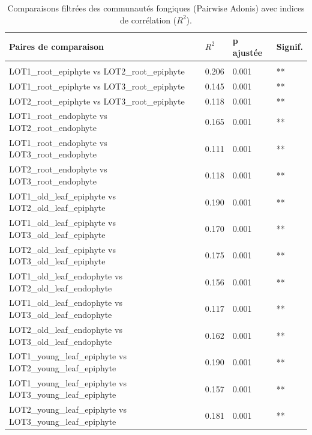 \documentclass[a4paper,12pt]{article}
\begin{document}
\begin{table}[H]
    \centering
    \caption{Comparaisons filtrées des communautés fongiques (Pairwise Adonis) avec indices de corrélation ($R^2$).}
    \label{tab:permanova_pairwise_final}
    \renewcommand{\arraystretch}{1.1}
    \setlength{\tabcolsep}{6pt}
    \small
    \begin{tabular}{llll}
        \hline
        \textbf{Paires de comparaison} & \textbf{$R^2$} & \textbf{p ajustée} & \textbf{Signif.} \\
        \hline
        \rowcolor[gray]{0.9} \multicolumn{4}{l}{\textit{Comparaisons Inter-sites (Même organe \& Même position)}} \\
        LOT1\_root\_epiphyte vs LOT2\_root\_epiphyte & 0.206 & 0.001 & ** \\
        LOT1\_root\_epiphyte vs LOT3\_root\_epiphyte & 0.145 & 0.001 & ** \\
        LOT2\_root\_epiphyte vs LOT3\_root\_epiphyte & 0.118 & 0.001 & ** \\
        LOT1\_root\_endophyte vs LOT2\_root\_endophyte & 0.165 & 0.001 & ** \\
        LOT1\_root\_endophyte vs LOT3\_root\_endophyte & 0.111 & 0.001 & ** \\
        LOT2\_root\_endophyte vs LOT3\_root\_endophyte & 0.118 & 0.001 & ** \\
        LOT1\_old\_leaf\_epiphyte vs LOT2\_old\_leaf\_epiphyte & 0.190 & 0.001 & ** \\
        LOT1\_old\_leaf\_epiphyte vs LOT3\_old\_leaf\_epiphyte & 0.170 & 0.001 & ** \\
        LOT2\_old\_leaf\_epiphyte vs LOT3\_old\_leaf\_epiphyte & 0.175 & 0.001 & ** \\
        LOT1\_old\_leaf\_endophyte vs LOT2\_old\_leaf\_endophyte & 0.156 & 0.001 & ** \\
        LOT1\_old\_leaf\_endophyte vs LOT3\_old\_leaf\_endophyte & 0.117 & 0.001 & ** \\
        LOT2\_old\_leaf\_endophyte vs LOT3\_old\_leaf\_endophyte & 0.162 & 0.001 & ** \\
        LOT1\_young\_leaf\_epiphyte vs LOT2\_young\_leaf\_epiphyte & 0.190 & 0.001 & ** \\
        LOT1\_young\_leaf\_epiphyte vs LOT3\_young\_leaf\_epiphyte & 0.157 & 0.001 & ** \\
        LOT2\_young\_leaf\_epiphyte vs LOT3\_young\_leaf\_epiphyte & 0.181 & 0.001 & ** \\
        

\end{tabular}
\end{table}
\end{document}
